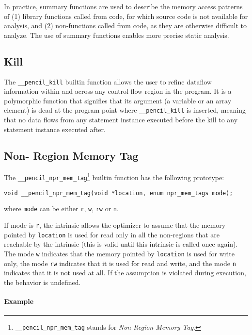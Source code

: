\documentclass{llncs}
\begin{document}
In practice, summary functions are used to describe the memory access
patterns of (1) library functions called from \pencil code, for which
source code is not available for analysis, and (2) non-\pencil functions
called from \pencil code, as they are otherwise difficult to analyze.
The use of summary functions enables more precise static analysis.

\subsection{\pencil Kill}
\label{sec:kill}

The \lstinline!__pencil_kill! builtin function
allows the user to refine dataflow information
within and across any control flow region in the program.
It is a polymorphic function that signifies that its argument
(a variable or an array element) is dead at the program point
where \lstinline!__pencil_kill! is inserted, meaning that no data
flows from any statement instance executed before the kill to any
statement instance executed after.

\subsection{Non-\pencil{} Region Memory Tag}

The \lstinline!__pencil_npr_mem_tag!\footnote{\lstinline!__pencil_npr_mem_tag!
stands for \emph{Non \pencil Region Memory Tag}.} builtin function has the
following prototype:

\begin{lstlisting}[language=pencil]
void __pencil_npr_mem_tag(void *location, enum npr_mem_tags mode);
\end{lstlisting}

\noindent where \lstinline!mode! can be either \lstinline!r!,
\lstinline!w!, \lstinline!rw! or \lstinline!n!.

If mode is \lstinline!r!, the intrinsic allows the optimizer to assume that
the memory pointed by \lstinline!location! is used for read only in all the
non-\pencil regions that are reachable by the intrinsic (this is
valid until this intrinsic is called once again).
The mode \lstinline!w! indicates that the memory pointed by \lstinline!location!
is used for write only, the mode \lstinline!rw! indicates that it is used for
read and write, and the mode \lstinline!n! indicates that it is not used at
all.
If the assumption is violated during execution, the behavior
is undefined.

\paragraph{Example}
\end{document}
